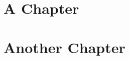 \documentclass{report}
\begin{document}
\tableofcontents
\chapter{A Chapter}
\chapter{Another Chapter}


\end{document}
